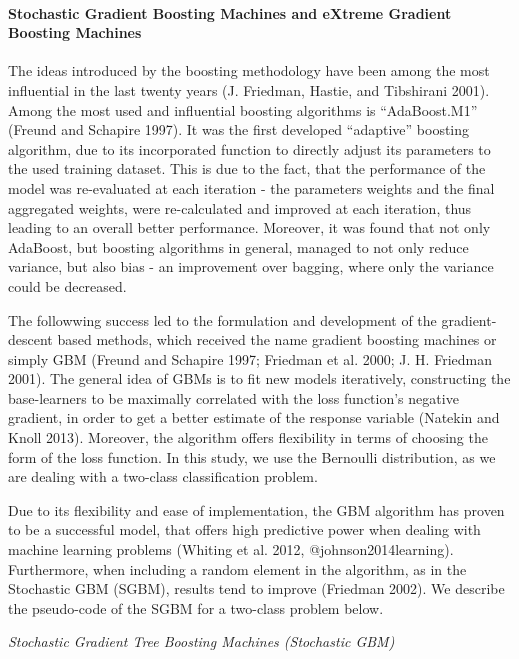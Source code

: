 \documentclass[12pt,]{article}
\let\oldparagraph\paragraph
\renewcommand{\paragraph}[1]{\oldparagraph{#1}\mbox{}}
\begin{document}
\hypertarget{stochastic-gradient-boosting-machines-and-extreme-gradient-boosting-machines}{%
\paragraph{Stochastic Gradient Boosting Machines and eXtreme Gradient
Boosting
Machines}\label{stochastic-gradient-boosting-machines-and-extreme-gradient-boosting-machines}}

The ideas introduced by the boosting methodology have been among the
most influential in the last twenty years (J. Friedman, Hastie, and
Tibshirani 2001). Among the most used and influential boosting
algorithms is ``AdaBoost.M1'' (Freund and Schapire 1997). It was the
first developed ``adaptive'' boosting algorithm, due to its incorporated
function to directly adjust its parameters to the used training dataset.
This is due to the fact, that the performance of the model was
re-evaluated at each iteration - the parameters weights and the final
aggregated weights, were re-calculated and improved at each iteration,
thus leading to an overall better performance. Moreover, it was found
that not only AdaBoost, but boosting algorithms in general, managed to
not only reduce variance, but also bias - an improvement over bagging,
where only the variance could be decreased.

The followwing success led to the formulation and development of the
gradient-descent based methods, which received the name gradient
boosting machines or simply GBM (Freund and Schapire 1997; Friedman et
al. 2000; J. H. Friedman 2001). The general idea of GBMs is to fit new
models iteratively, constructing the base-learners to be maximally
correlated with the loss function's negative gradient, in order to get a
better estimate of the response variable (Natekin and Knoll 2013).
Moreover, the algorithm offers flexibility in terms of choosing the form
of the loss function. In this study, we use the Bernoulli distribution,
as we are dealing with a two-class classification problem.

Due to its flexibility and ease of implementation, the GBM algorithm has
proven to be a successful model, that offers high predictive power when
dealing with machine learning problems (Whiting et al. 2012,
@johnson2014learning). Furthermore, when including a random element in
the algorithm, as in the Stochastic GBM (SGBM), results tend to improve
(Friedman 2002). We describe the pseudo-code of the SGBM for a two-class
problem below.

\emph{Stochastic Gradient Tree Boosting Machines (Stochastic GBM)}
\end{document}
